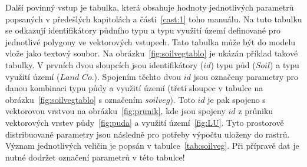 Další povinný vstup je tabulka, která obsahuje hodnoty jednotlivých parametrů popsaných v předešlých kapitolách a části~\ref{cast:1} toho manuálu. Na tuto tabulku se odkazují identifikátory půdního typu a typu využití území definované pro jednotlivé polygony ve vektorových vstupech. Tato tabulka může být do modelu vlože jako textový soubor. Na obrázku~\ref{fig:soilvegtablo} je ukázán příklad takové tabulky. V prvních dvou sloupcích jsou identifikátory ($id$) typu půd ($Soil$) a typu využití území ($Land$ $Co.$). Spojením těchto dvou $id$ jsou označeny parametry pro danou kombinaci typu půdy a využití území (třetí sloupec v tabulce na obrázku~\ref{fig:soilvegtablo} s označením $soilveg$). Toto $id$ je pak spojeno s vektorovou vrstvou na obrázku~\ref{fig:prunik}, kde jsou spojeny $id$ z průniku vektorových vrstev půdy~\ref{fig:puda} a využití území~\ref{fig:LU}. Tyto prostorově distribuované parametry jsou následně pro potřeby výpočtu uloženy do rastrů. Význam jednotlivých veličin je popsán v tabulce~\ref{tab:soilveg}. Při přípravě dat je nutné dodržet označení parametrů v této tabulce!

% 






